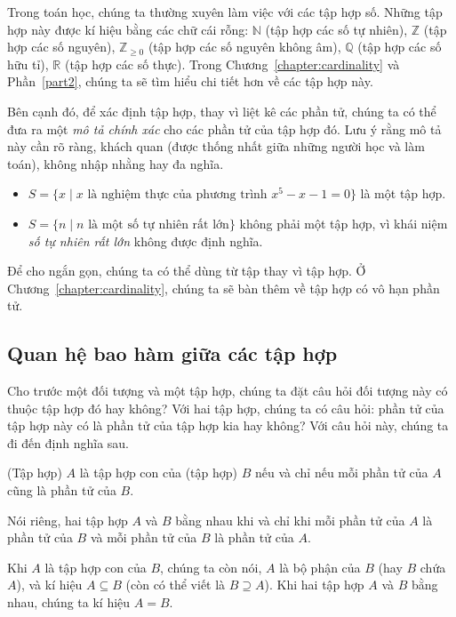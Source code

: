 Trong toán học, chúng ta thường xuyên làm việc với các tập hợp số. Những tập hợp này được kí hiệu bằng các chữ cái rỗng: $\mathbb{N}$ (tập hợp các số tự nhiên), $\mathbb{Z}$ (tập hợp các số nguyên), $\mathbb{Z}_{\geq 0}$ (tập hợp các số nguyên không âm), $\mathbb{Q}$ (tập hợp các số hữu tỉ), $\mathbb{R}$ (tập hợp các số thực). Trong Chương~\ref{chapter:cardinality} và Phần~\ref{part2}, chúng ta sẽ tìm hiểu chi tiết hơn về các tập hợp này.

Bên cạnh đó, để xác định tập hợp, thay vì liệt kê các phần tử, chúng ta có thể đưa ra một \textit{mô tả chính xác} cho các phần tử của tập hợp đó. Lưu ý rằng mô tả này cần rõ ràng, khách quan (được thống nhất giữa những người học và làm toán), không nhập nhằng hay đa nghĩa.
\begin{itemize}
    \item $S = \{ x \mid \text{$x$ là nghiệm thực của phương trình $x^{5} - x - 1 = 0$} \}$ là một tập hợp.
    \item $S = \{ n \mid \text{$n$ là một số tự nhiên rất lớn} \}$ không phải một tập hợp, vì khái niệm \textit{số tự nhiên rất lớn} không được định nghĩa.
\end{itemize}

Để cho ngắn gọn, chúng ta có thể dùng từ tập thay vì tập hợp. Ở Chương~\ref{chapter:cardinality}, chúng ta sẽ bàn thêm về tập hợp có vô hạn phần tử.

\subsection{Quan hệ bao hàm giữa các tập hợp}

Cho trước một đối tượng và một tập hợp, chúng ta đặt câu hỏi đối tượng này có thuộc tập hợp đó hay không? Với hai tập hợp, chúng ta có câu hỏi: phần tử của tập hợp này có là phần tử của tập hợp kia hay không? Với câu hỏi này, chúng ta đi đến định nghĩa sau.

\begin{definition}
    (Tập hợp) $A$ là tập hợp con của (tập hợp) $B$ nếu và chỉ nếu mỗi phần tử của $A$ cũng là phần tử của $B$.

    Nói riêng, hai tập hợp $A$ và $B$ bằng nhau khi và chỉ khi mỗi phần tử của $A$ là phần tử của $B$ và mỗi phần tử của $B$ là phần tử của $A$.
\end{definition}

Khi $A$ là tập hợp con của $B$, chúng ta còn nói, $A$ là bộ phận của $B$ (hay $B$ chứa $A$), và kí hiệu $A\subseteq B$ (còn có thể viết là $B\supseteq A$). Khi hai tập hợp $A$ và $B$ bằng nhau, chúng ta kí hiệu $A = B$.

